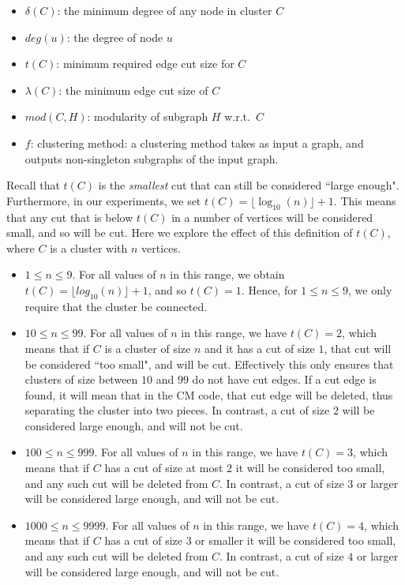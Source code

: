 \documentclass[a4paper]{article}   	%
\begin{document}
\begin{itemize}
    \item $\delta(C)$: the minimum degree of  any node in cluster $C$
    \item $deg(u)$: the degree of node $u$
    \item $t(C)$: minimum required edge cut size for  $C$
    \item $\lambda(C)$: the minimum edge cut size of $C$
    \item $mod(C, H)$: modularity of subgraph $H$ w.r.t.~$C$
    \item $f$: clustering method: a clustering method takes as input a graph, and outputs non-singleton subgraphs of the input graph.
\end{itemize}

Recall that  $t(C)$ is the {\em smallest} cut that can still be considered ``large enough".
Furthermore, in our experiments, we set $t(C) = \lfloor \log_{10}(n) \rfloor +1$.  This means that any cut that is below $t(C)$ in a number of vertices
will be considered small, and so will be cut.
Here we explore the effect of this definition of $t(C)$, where $C$ is a cluster with $n$ vertices.
\begin{itemize}
\item
$1 \leq n \leq 9$.
For all values of $n$ in this range, we obtain $t(C) = \lfloor log_{10}(n) \rfloor +1$, and so $t(C) = 1$.  Hence, for $1 \leq n \leq 9$, we  only require that the
cluster be connected.
\item
$10 \leq n \leq 99$. For all values of $n$ in this range, we have
 $t(C) = 2$, which means that if $C$ is a cluster of size $n$ and it has a cut of size $1$, that  cut will
be considered ``too small", and will be cut.  Effectively this only ensures that clusters of size between $10$ and $99$ do not have cut edges.
If a cut edge is found, it will mean that in the CM code, that cut edge will be deleted, thus separating the cluster into two pieces.
In contrast, a cut of size $2$ will be considered large enough, and will not be cut.
\item
$100 \leq n \leq 999$.
For all values of $n$ in this range, we have $t(C)=3$, which means that if $C$ has a cut of size  at most $2$ it will be considered
too small, and any such cut will be deleted from $C$.
In contrast, a cut of size $3$  or larger will be considered large enough, and will not be cut.
\item
$1000 \leq n \leq 9999$.
For all values of $n$ in this range, we have $t(C)=4$, which means that if $C$ has a cut of size $3$ or smaller it will be considered
too small, and any such cut will be deleted from $C$.
In contrast, a cut of size $4$ or larger will be considered large enough, and will not be cut.
\end{itemize}
\end{document}
